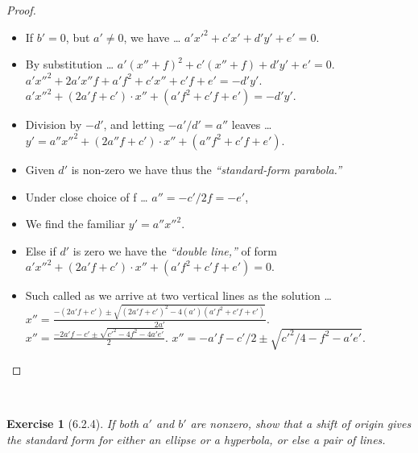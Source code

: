 \documentclass[12pt]{article}
\newcommand{\XB}{\color{black}}
\newcommand{\XBB}{\color{blue}}
\newcommand{\ds}{\displaystyle}
\theoremstyle{plain}
\newtheorem{ex}{Exercise}
\begin{document}
\begin{proof}
  \ \\

  \begin{itemize}
    \item If $ b' = 0 $, but $ a' \neq 0 $, we have \dots
    \subitem $ \ds a'x'^{2} + c'x' + d'y' + e' = 0 $.
    \item By substitution \dots 
    \subitem $ \ds a'(x'' + f)^{2} + c'(x'' + f) + d'y' + e' = 0 $.
    \subitem $ \ds a'x''^{2} + 2a'x''f + a'f^{2} + c'x'' + c'f + e' = - d'y' $.
    \subitem $ \ds a'x''^{2} + (2a'f + c') \cdot x'' + (a'f^{2} + c'f + e') = - d'y' $.
    \item Division by $ -d' $, and letting $ -a'/d' = a'' $ leaves \dots
    \subitem $ \ds y' = a''x''^{2} + (2a''f + c') \cdot x'' + (a''f^{2} + c'f + e') $.
    \item Given $ d' $ is non-zero we have thus the \textit{``standard-form parabola.''}
    \item Under close choice of f \dots 
    \subitem $ \ds a'' = - c'/2f = - e' $,
    \item We find the familiar $ \ds y' = a''x''^{2} $.
    \item Else if $ d' $ is zero we have the \textit{``double line,''} of form 
    \subitem $ \ds a'x''^{2} + (2a'f + c') \cdot x'' + (a'f^{2} + c'f + e') = 0 $.
    \item Such called as we arrive at two vertical lines as the solution \dots
    \subitem $ \ds x'' = \frac{\ds -(2a'f + c') \pm \sqrt{(2a'f + c')^{2} - 4(a')(a'f^{2} + c'f + e')}}{2a'} $.
    \subitem $ \ds x'' = \frac{\ds -2a'f - c' \pm \sqrt{c'^{2} - 4f^{2} - 4a'e'}}{2} $.
    \subitem $ \ds x'' = \ds -a'f - c'/2 \pm \sqrt{c'^{2}/4 - f^{2} - a'e'} $.
  \end{itemize}

\end{proof}

\newpage


\XBB\hrulefill\XB \\
\begin{ex} [6.2.4]
  If both $ a' $ and $ b' $ are nonzero, 
  show that a shift of origin gives the standard form for either an ellipse or a hyperbola, or else a pair of lines.
\end{ex}
\XBB\hrulefill\XB \\
\end{document}

